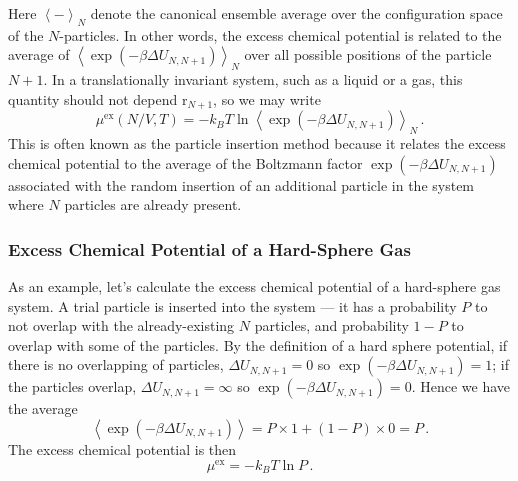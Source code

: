 \documentclass{article}
\theoremstyle{plain}\theoremheaderfont{\normalfont\bfseries}\theorembodyfont{\rmfamily}\theoremseparator{.}\newtheorem*{thm}{Theorem}\newtheorem*{law}{Law}\newtheorem*{pos}{Postulate}
\numberwithin{equation}{section}
\newcommand{\eval}[1]{\left\langle #1 \right\rangle}
\newcommand{\vb}[1]{\bm{\mathrm{#1}}}
\begin{document}
    Here \(\eval{-}_N\) denote the canonical ensemble average over the configuration space of the \(N\)-particles. In other words, the excess chemical potential is related to the average of \(\eval{\exp(-\beta\Delta U_{N,N+1})}_N\) over all possible positions of the particle \(N+1\). In a translationally invariant system, such as a liquid or a gas, this quantity should not depend \(\vb{r}_{N+1}\), so we may write
    \begin{equation}\label{Widom_formula}
        \mu^{\text{ex}}(N/V,T)=-k_B T\ln\eval{\exp(-\beta\Delta U_{N,N+1})}_N\,.
    \end{equation}
    This is often known as the particle insertion method because it relates the excess chemical potential to the average of the Boltzmann factor \(\exp(-\beta\Delta U_{N,N+1})\) associated with the random insertion of an additional particle in the system where \(N\) particles are already present.

    \subsubsection{Excess Chemical Potential of a Hard-Sphere Gas}
    As an example, let's calculate the excess chemical potential of a hard-sphere gas system. A trial particle is inserted into the system --- it has a probability \(P\) to not overlap with the already-existing \(N\) particles, and probability \(1-P\) to overlap with some of the particles. By the definition of a hard sphere potential, if there is no overlapping of particles, \(\Delta U_{N,N+1}=0\) so \(\exp(-\beta \Delta U_{N,N+1})=1\); if the particles overlap, \(\Delta U_{N,N+1}=\infty\) so \(\exp(-\beta \Delta U_{N,N+1})=0\). Hence we have the average
    \begin{equation}
        \eval{\exp(-\beta\Delta U_{N,N+1})}=P\times 1+(1-P)\times 0=P\,.
    \end{equation}
    The excess chemical potential is then
    \begin{equation}
        \mu^{\text{ex}}=-k_B T\ln P\,.
    \end{equation}
\end{document}

